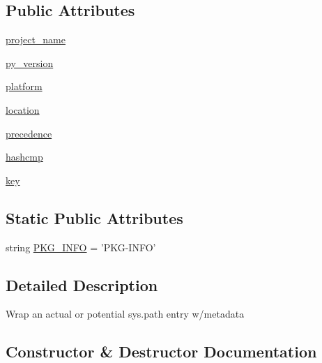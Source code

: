 \subsection*{Public Attributes}
\begin{DoxyCompactItemize}
\item 
\hyperlink{classpkg__resources_1_1Distribution_a5a41ba765e57c1fe39b6405c2dff69c7}{project\+\_\+name}
\item 
\hyperlink{classpkg__resources_1_1Distribution_a94c84ff74167eef63fecce9f5e3c2a85}{py\+\_\+version}
\item 
\hyperlink{classpkg__resources_1_1Distribution_a0d3120e21ef127c42294a9ad2149613d}{platform}
\item 
\hyperlink{classpkg__resources_1_1Distribution_a48f64f0791d0dffea14e22b9dbc210b3}{location}
\item 
\hyperlink{classpkg__resources_1_1Distribution_afaa162e116709a2b7f4d5e2cd2f4bdcc}{precedence}
\item 
\hyperlink{classpkg__resources_1_1Distribution_af308221b891f0ecdab82948e96bd77be}{hashcmp}
\item 
\hyperlink{classpkg__resources_1_1Distribution_acd3cd8d8ebc1d5b72cee86c87e45049f}{key}
\end{DoxyCompactItemize}
\subsection*{Static Public Attributes}
\begin{DoxyCompactItemize}
\item 
string \hyperlink{classpkg__resources_1_1Distribution_a2c183fa8364c9029abea5a0f502ffbea}{P\+K\+G\+\_\+\+I\+N\+F\+O} = 'P\+K\+G-\/I\+N\+F\+O'
\end{DoxyCompactItemize}


\subsection{Detailed Description}
\begin{DoxyVerb}Wrap an actual or potential sys.path entry w/metadata\end{DoxyVerb}
 

\subsection{Constructor \& Destructor Documentation}
\hypertarget{classpkg__resources_1_1Distribution_afb3f580d401dd0f68c6f1baa7c9c4ef8}{}
